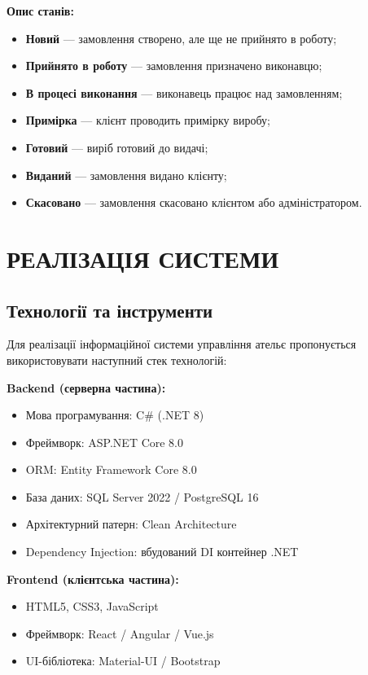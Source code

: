 \documentclass[14pt,a4paper]{extarticle}
\begin{document}
\textbf{Опис станів:}
\begin{itemize}
    \item \textbf{Новий} --- замовлення створено, але ще не прийнято в роботу;
    \item \textbf{Прийнято в роботу} --- замовлення призначено виконавцю;
    \item \textbf{В процесі виконання} --- виконавець працює над замовленням;
    \item \textbf{Примірка} --- клієнт проводить примірку виробу;
    \item \textbf{Готовий} --- виріб готовий до видачі;
    \item \textbf{Виданий} --- замовлення видано клієнту;
    \item \textbf{Скасовано} --- замовлення скасовано клієнтом або адміністратором.
\end{itemize}

\newpage
\section{РЕАЛІЗАЦІЯ СИСТЕМИ}

\subsection{Технології та інструменти}

Для реалізації інформаційної системи управління ательє пропонується використовувати наступний стек технологій:

\textbf{Backend (серверна частина):}
\begin{itemize}
    \item Мова програмування: C\# (.NET 8)
    \item Фреймворк: ASP.NET Core 8.0
    \item ORM: Entity Framework Core 8.0
    \item База даних: SQL Server 2022 / PostgreSQL 16
    \item Архітектурний патерн: Clean Architecture
    \item Dependency Injection: вбудований DI контейнер .NET
\end{itemize}

\textbf{Frontend (клієнтська частина):}
\begin{itemize}
    \item HTML5, CSS3, JavaScript
    \item Фреймворк: React / Angular / Vue.js
    \item UI-бібліотека: Material-UI / Bootstrap
\end{itemize}
\end{document}
